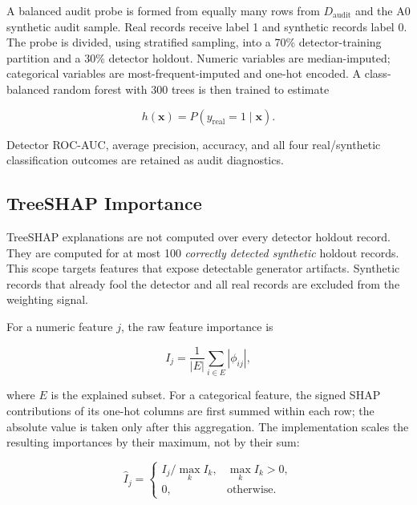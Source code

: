 A balanced audit probe is formed from equally many rows from
$D_{\mathrm{audit}}$ and the A0 synthetic audit sample. Real records receive
label 1 and synthetic records label 0. The probe is divided, using stratified
sampling, into a 70\% detector-training partition and a 30\% detector holdout.
Numeric variables are median-imputed; categorical variables are
most-frequent-imputed and one-hot encoded. A class-balanced random forest with
300 trees is then trained to estimate

\begin{equation}
    h(\mathbf{x}) = P(y_{\mathrm{real}}=1\mid\mathbf{x}).
\end{equation}

Detector ROC-AUC, average precision, accuracy, and all four real/synthetic
classification outcomes are retained as audit diagnostics.

\subsection{TreeSHAP Importance}
\label{subsec:treeshap_importance}

TreeSHAP explanations are not computed over every detector holdout record.
They are computed for at most 100 \emph{correctly detected synthetic} holdout
records. This scope targets features that expose detectable generator
artifacts. Synthetic records that already fool the detector and all real
records are excluded from the weighting signal.

For a numeric feature $j$, the raw feature importance is

\begin{equation}
    I_j = \frac{1}{|E|}\sum_{i\in E}|\phi_{ij}|,
    \label{eq:raw_shap_importance}
\end{equation}

where $E$ is the explained subset. For a categorical feature, the signed SHAP
contributions of its one-hot columns are first summed within each row; the
absolute value is taken only after this aggregation. The implementation scales
the resulting importances by their maximum, not by their sum:

\begin{equation}
    \widehat{I}_j =
    \begin{cases}
        I_j / \max_k I_k, & \max_k I_k > 0,\\
        0, & \text{otherwise}.
    \end{cases}
    \label{eq:max_normalized_shap}
\end{equation}

